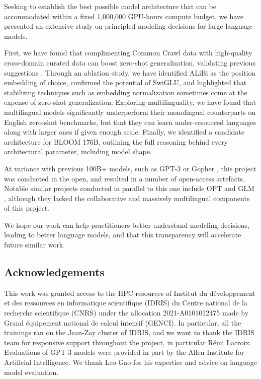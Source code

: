 Seeking to establish the best possible model architecture that can be accommodated within a fixed 1,000,000 GPU-hours compute budget, we have presented an extensive study on principled modeling decisions for large language models.

First, we have found that complimenting Common Crawl data with high-quality cross-domain curated data can boost zero-shot generalization, validating previous suggestions \cite{rossettnlg, gao2020pile}. Through an ablation study, we have identified ALiBi as the position embedding of choice, confirmed the potential of SwiGLU, and highlighted that stabilizing techniques such as embedding normalization sometimes come at the expense of zero-shot generalization. Exploring multilinguality, we have found that multilingual models significantly underperform their monolingual counterparts on English zero-shot benchmarks, but that they can learn under-resourced languages along with larger ones if given enough scale. Finally, we identified a candidate architecture for BLOOM 176B, outlining the full reasoning behind every architectural parameter, including model shape. 

At variance with previous 100B+ models, such as GPT-3 \cite{brown2020gpt3} or Gopher \cite{rae2021scaling}, this project was conducted in the open, and resulted in a number of open-access artefacts. Notable similar projects conducted in parallel to this one include OPT \cite{zhang2022opt} and GLM \cite{zeng2022glm}, although they lacked the collaborative and massively multilingual components of this project.

We hope our work can help practitioners better understand modeling decisions, leading to better language models, and that this transparency will accelerate future similar work.

\subsection*{Acknowledgements}
This work was granted access to the HPC resources of Institut du d\'eveloppement et des ressources en informatique scientifique (IDRIS) du Centre national de la recherche scientifique (CNRS) under the allocation 2021-A0101012475 made by Grand \'equipement national de calcul intensif (GENCI). In particular, all the trainings ran on the Jean-Zay cluster of IDRIS, and we want to thank the IDRIS team for responsive support throughout the project, in particular R\'emi Lacroix.
Evaluations of GPT-3 models were provided in part by the Allen Institute for Artificial Intelligence. We thank Leo Gao for his expertise and advice on language model evaluation.
